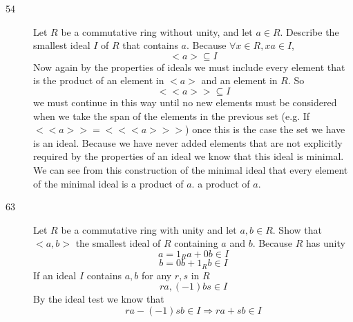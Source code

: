 \documentclass[11pt]{article}
\begin{document}
\begin{description}
\item[54] Let $R$ be a commutative ring without unity, and let $a \in R$.
	Describe the smallest ideal $I$ of $R$ that contains $a$.
	Because $\forall x \in R, xa \in I $, 
	$$ <a> \subseteq I $$
	Now again by the properties of ideals we must include every element that
	is the product of an element in $<a>$ and an element in $R$. So
	$$<<a>> \subseteq I$$
	we must continue in this way until no new elements must be considered
	when we take the span of the elements in the previous set (e.g. If
	$<<a>> = <<<a>>>$) once this is the case the set we have is an ideal.
	Because we have never added elements that are not explicitly required by
	the properties of an ideal we know that this ideal is minimal.
	 We can see from this construction of the minimal ideal that every element of
	 the minimal ideal is a product of $a$.
	a product of $a$.
\item[63] Let $R$ be a commutative ring with unity and let $a,b \in R$. Show
	that $<a,b>$ the smallest ideal of $R$ containing $a$ and $b$.
	Because $R$ has unity
	$$ a = 1_Ra + 0b \in I$$
	$$ b = 0b + 1_Rb \in I$$
	If an ideal $I$ contains $a, b$ for any $r,s$ in $R$
		$$ra, (-1)bs \in I$$
	By the ideal test we know that
	$$ ra - (-1)sb \in I \Rightarrow ra+sb \in I$$


\end{description}
\end{document}
